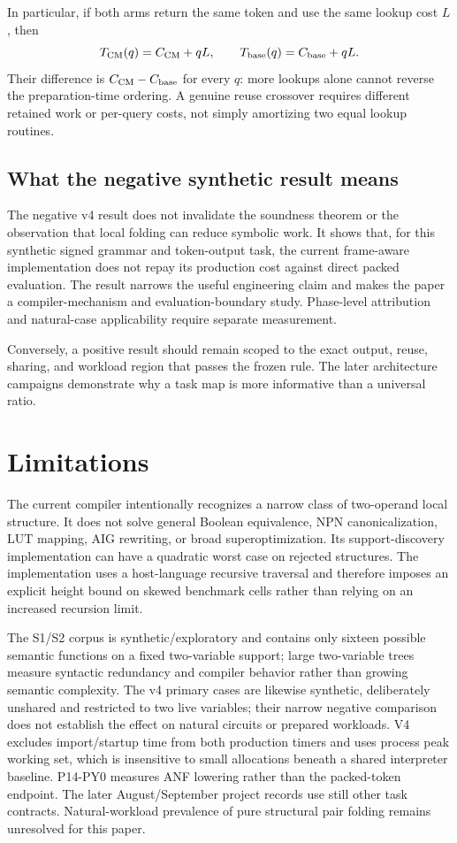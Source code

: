 \documentclass[10pt]{article}
\theoremstyle{plain}
\theoremstyle{definition}
\theoremstyle{remark}
\begin{document}
In particular, if both arms return the same token and use the same lookup cost $L$, then
\[
 T_{\rm CM}(q)=C_{\rm CM}+qL,\qquad
 T_{\rm base}(q)=C_{\rm base}+qL.
\]
Their difference is $C_{\rm CM}-C_{\rm base}$ for every $q$: more lookups alone cannot reverse the preparation-time ordering. A genuine reuse crossover requires different retained work or per-query costs, not simply amortizing two equal lookup routines.

\subsection{What the negative synthetic result means}

The negative v4 result does not invalidate the soundness theorem or the observation that local folding can reduce symbolic work. It shows that, for this synthetic signed grammar and token-output task, the current frame-aware implementation does not repay its production cost against direct packed evaluation. The result narrows the useful engineering claim and makes the paper a compiler-mechanism and evaluation-boundary study. Phase-level attribution and natural-case applicability require separate measurement.

Conversely, a positive result should remain scoped to the exact output, reuse, sharing, and workload region that passes the frozen rule. The later architecture campaigns demonstrate why a task map is more informative than a universal ratio.

\section{Limitations}

The current compiler intentionally recognizes a narrow class of two-operand local structure. It does not solve general Boolean equivalence, NPN canonicalization, LUT mapping, AIG rewriting, or broad superoptimization. Its support-discovery implementation can have a quadratic worst case on rejected structures. The implementation uses a host-language recursive traversal and therefore imposes an explicit height bound on skewed benchmark cells rather than relying on an increased recursion limit.

The S1/S2 corpus is synthetic/exploratory and contains only sixteen possible semantic functions on a fixed two-variable support; large two-variable trees measure syntactic redundancy and compiler behavior rather than growing semantic complexity. The v4 primary cases are likewise synthetic, deliberately unshared and restricted to two live variables; their narrow negative comparison does not establish the effect on natural circuits or prepared workloads. V4 excludes import/startup time from both production timers and uses process peak working set, which is insensitive to small allocations beneath a shared interpreter baseline. P14-PY0 measures ANF lowering rather than the packed-token endpoint. The later August/September project records use still other task contracts. Natural-workload prevalence of pure structural pair folding remains unresolved for this paper.
\end{document}
